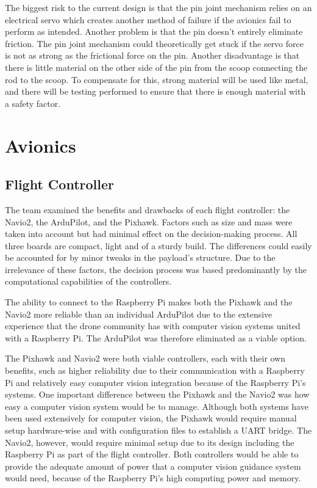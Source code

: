 		The biggest risk to the current design is that the pin joint mechanism relies on an electrical servo which creates another method of failure if the avionics fail to perform as intended. Another problem is that the pin doesn’t entirely eliminate friction. The pin joint mechanism could theoretically get stuck if the servo force is not as strong as the frictional force on the pin. Another disadvantage is that there is little material on the other side of the pin from the scoop connecting the rod to the scoop. To compensate for this, strong material will be used like metal, and there will be testing performed to ensure that there is enough material with a safety factor.



	\section{Avionics}\label{PL:Design:Avionics}
		\subsection{Flight Controller}
		The team examined the benefits and drawbacks of each flight controller: the Navio2, the ArduPilot, and the Pixhawk. Factors such as size and mass were taken into account but had minimal effect on the decision-making process. All three boards are compact, light and of a sturdy build. The differences could easily be accounted for by minor tweaks in the payload’s structure. Due to the irrelevance of these factors, the decision process was based predominantly by the computational capabilities of the controllers. 

		The ability to connect to the Raspberry Pi makes both the Pixhawk and the Navio2 more reliable than an individual ArduPilot due to the extensive experience that the drone community has with computer vision systems united with a Raspberry Pi. The ArduPilot was therefore eliminated as a viable option. 
		
		The Pixhawk and Navio2 were both viable controllers, each with their own benefits, such as higher reliability due to their communication with a Raspberry Pi and relatively easy computer vision integration because of the Raspberry Pi’s systems. One important difference between the Pixhawk and the Navio2 was how easy a computer vision system would be to manage. Although both systems have been used extensively for computer vision, the Pixhawk would require manual setup hardware-wise and with configuration files to establish a UART bridge. The Navio2, however, would require minimal setup due to its design including the Raspberry Pi as part of the flight controller. Both controllers would be able to provide the adequate amount of power that a computer vision guidance system would need, because of the Raspberry Pi’s high computing power and memory. 
		
